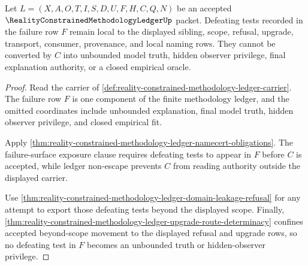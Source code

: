 \begin{theorem}
\label{thm:reality-constrained-methodology-ledger-failure-route-locality}
Let $L=(X,A,O,T,I,S,D,U,F,H,C,Q,N)$ be an accepted $\RealityConstrainedMethodologyLedgerUp$ packet. Defeating tests recorded in the failure row $F$ remain local to the displayed sibling, scope, refusal, upgrade, transport, consumer, provenance, and local naming rows. They cannot be converted by $C$ into unbounded model truth, hidden observer privilege, final explanation authority, or a closed empirical oracle.
\end{theorem}
\begin{proof}
Read the carrier of \autoref{def:reality-constrained-methodology-ledger-carrier}. The failure row $F$ is one component of the finite methodology ledger, and the omitted coordinates include unbounded explanation, final model truth, hidden observer privilege, and closed empirical fit.

Apply \autoref{thm:reality-constrained-methodology-ledger-namecert-obligations}. The failure-surface exposure clause requires defeating tests to appear in $F$ before $C$ is accepted, while ledger non-escape prevents $C$ from reading authority outside the displayed carrier.

Use \autoref{thm:reality-constrained-methodology-ledger-domain-leakage-refusal} for any attempt to export those defeating tests beyond the displayed scope. Finally, \autoref{thm:reality-constrained-methodology-ledger-upgrade-route-determinacy} confines accepted beyond-scope movement to the displayed refusal and upgrade rows, so no defeating test in $F$ becomes an unbounded truth or hidden-observer privilege.
\end{proof}

